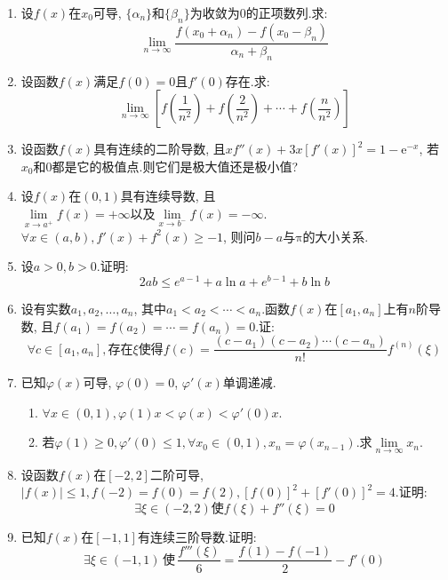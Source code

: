 \documentclass[utf8]{ctexart}
\begin{document}
\begin{enumerate}
   \item 设$f(x)$在$x_0$可导, $\{\alpha_n\}$和$\{\beta_n\}$为收敛为$0$的正项数列.求:
      \[
	 \lim_{n\rightarrow\infty}\frac{f(x_0+\alpha_n)-f(x_0-\beta_n)}{\alpha_n+\beta_n}
      \]
   \item 设函数$f(x)$满足$f(0)=0$且$f'(0)$存在.求:
      \[
	 \lim_{n\rightarrow\infty}[f(\frac{1}{n^2})+f(\frac{2}{n^2})+\cdots+f(\frac{n}{n^2})]
      \]
   \item 设函数$f(x)$具有连续的二阶导数, 且$xf''(x)+3x{[f'(x)]}^2=1-{\mathrm{e}}^{-x}$, 若$x_0$和$0$都是它的极值点.则它们是极大值还是极小值?
   \item 设$f(x)$在$(0, 1)$具有连续导数, 且$\lim\limits_{x\rightarrow a^+}f(x)=+\infty\text{以及}\lim\limits_{x\rightarrow b^-}f(x)%
      =-\infty$.\newline
      $\forall x\in(a, b), f'(x)+f^2(x)\geqslant-1$, 则问$b-a$与$\mathrm{\pi}$的大小关系.
   \item 设$a>0, b>0$.证明:
      \[
	 2ab\leqslant e^{a-1}+a\ln a+e^{b-1}+b\ln b
      \]
   \item 设有实数$a_1, a_2, \ldots, a_n$, 其中$a_1<a_2<\cdots<a_n$.函数$f(x)$在$[a_1, a_n]$上有$n$阶导数, 且$f(a_1)=f(a_2)=\cdots=f(a_n)=0$.证:
      \[
	 \forall c\in[a_1, a_n], \text{存在}\xi\text{使得}f(c)=\frac{(c-a_1)(c-a_2)\cdots(c-a_n)}{n!}f^{(n)}(\xi)
      \]
   \item 已知$\varphi(x)$可导, $\varphi(0)=0$, $\varphi'(x)$单调递减.
      \begin{enumerate}
	 \item $\forall x\in(0, 1), \varphi(1)x<\varphi(x)<\varphi'(0)x$.
	 \item 若$\varphi(1)\geqslant 0, \varphi'(0)\leqslant 1, \forall x_0\in(0, 1), x_n=\varphi(x_{n-1})$.求$\lim\limits_{n\rightarrow\infty}x_n$.
      \end{enumerate}
   \item 设函数$f(x)$在$[-2, 2]$二阶可导, $\lvert f(x)\lvert\leqslant 1, f(-2)=f(0)=f(2), {[f(0)]}^2+{[f'(0)]}^2=4$.证明:
      \[
	 \exists\xi\in(-2, 2)\text{使}f(\xi)+f''(\xi)=0
      \]
   \item 已知$f(x)$在$[-1, 1]$有连续三阶导数.证明:
      \[
	 \exists\xi\in(-1, 1)\,\text{使}\,\frac{f'''(\xi)}{6}=\frac{f(1)-f(-1)}{2}-f'(0)
      \]
\end{enumerate}
\end{document}
